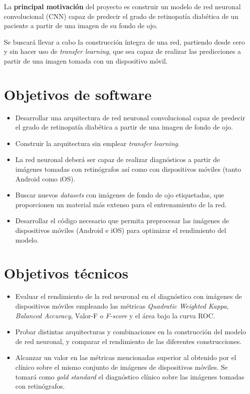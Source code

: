  \label{Obj}

La \textbf{principal motivación} del proyecto es construir un modelo de red neuronal convolucional (CNN) capaz de predecir el grado de retinopatía diabética de un paciente a partir de una imagen de su fondo de ojo.

Se buscará llevar a cabo la construcción íntegra de una red, partiendo desde cero y sin hacer uso de \textit{transfer learning}, que sea capaz de realizar las predicciones a partir de una imagen tomada con un dispositivo móvil.

\section{Objetivos de software}
\begin{itemize}[itemsep=0.25em]
    \item Desarrollar una arquitectura de red neuronal convolucional capaz de predecir el grado de retinopatía diabética a partir de una imagen de fondo de ojo.
    \item Construir la arquitectura sin emplear \textit{transfer learning}.
    \item La red neuronal deberá ser capaz de realizar diagnósticos a partir de imágenes tomadas con retinógrafos así como con dispositivos móviles (tanto Android como iOS).
    \item Buscar nuevos \textit{datasets} con imágenes de fondo de ojo etiquetadas, que proporcionen un material más extenso para el entrenamiento de la red.
    \item Desarrollar el código necesario que permita preprocesar las imágenes de dispositivos móviles (Android e iOS) para optimizar el rendimiento del modelo.
\end{itemize}

\section{Objetivos técnicos}
\begin{itemize}[itemsep=0.25em]
    \item Evaluar el rendimiento de la red neuronal en el diagnóstico con imágenes de dispositivos móviles empleando las métricas \textit{Quadratic Weighted Kappa}, \textit{Balanced Accuracy}, Valor-F o \textit{F-score} y el área bajo la curva ROC.
    \item Probar distintas arquitecturas y combinaciones en la construcción del modelo de red neuronal, y comparar el rendimiento de las diferentes construcciones. 
    \item Alcanzar un valor en las métricas mencionadas superior al obtenido por el clínico sobre el mismo conjunto de imágenes de dispositivos móviles. Se tomará como \textit{gold standard} el diagnóstico clínico sobre las imágenes tomadas con retinógrafos.
\end{itemize}


